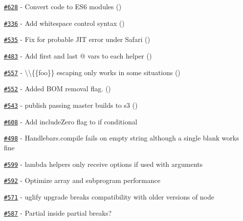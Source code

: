 \begin{DoxyItemize}
\item \href{https://github.com/wycats/handlebars.js/pull/628}{\tt \#628} -\/ Convert code to E\+S6 modules (\href{https://api.github.com/users/kpdecker}{\tt })
\item \href{https://github.com/wycats/handlebars.js/pull/336}{\tt \#336} -\/ Add whitespace control syntax (\href{https://api.github.com/users/kpdecker}{\tt })
\item \href{https://github.com/wycats/handlebars.js/pull/535}{\tt \#535} -\/ Fix for probable J\+IT error under Safari (\href{https://api.github.com/users/sorentwo}{\tt })
\item \href{https://github.com/wycats/handlebars.js/issues/483}{\tt \#483} -\/ Add first and last @ vars to each helper (\href{https://api.github.com/users/denniskuczynski}{\tt })
\item \href{https://github.com/wycats/handlebars.js/pull/557}{\tt \#557} -\/ {\ttfamily \textbackslash{}\textbackslash{}\{\{foo\}\}} escaping only works in some situations (\href{https://api.github.com/users/dmarcotte}{\tt })
\item \href{https://github.com/wycats/handlebars.js/pull/552}{\tt \#552} -\/ Added B\+OM removal flag. (\href{https://api.github.com/users/blessenm}{\tt })
\item \href{https://github.com/wycats/handlebars.js/pull/543}{\tt \#543} -\/ publish passing master builds to s3 (\href{https://api.github.com/users/fivetanley}{\tt })
\item \href{https://github.com/wycats/handlebars.js/issues/608}{\tt \#608} -\/ Add {\ttfamily include\+Zero} flag to {\ttfamily if} conditional
\item \href{https://github.com/wycats/handlebars.js/issues/498}{\tt \#498} -\/ {\ttfamily Handlebars.\+compile} fails on empty string although a single blank works fine
\item \href{https://github.com/wycats/handlebars.js/issues/599}{\tt \#599} -\/ lambda helpers only receive options if used with arguments
\item \href{https://github.com/wycats/handlebars.js/issues/592}{\tt \#592} -\/ Optimize array and subprogram performance
\item \href{https://github.com/wycats/handlebars.js/issues/571}{\tt \#571} -\/ uglify upgrade breaks compatibility with older versions of node
\item \href{https://github.com/wycats/handlebars.js/issues/587}{\tt \#587} -\/ Partial inside partial breaks?
\end{DoxyItemize}


